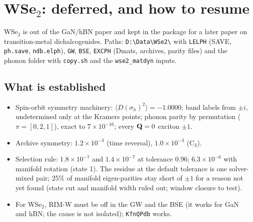 \section{WSe$_2$: deferred, and how to resume}
\label{sec:wse2}

WSe$_2$ is out of the GaN/hBN paper and kept in the package for a later paper
on transition-metal dichalcogenides. Paths: \texttt{D:\textbackslash Data\textbackslash WSe2\textbackslash}
with \texttt{LELPH} (SAVE, \texttt{ph.save}, \texttt{ndb.elph}), \texttt{GW},
\texttt{BSE}, \texttt{EXCPH} (Dmats, archives, parity files) and the phonon
folder with \texttt{copy.sh} and the \texttt{wse2\_matdyn} inputs.

\subsection{What is established}
\begin{itemize}[nosep,leftmargin=1.2em]
\item Spin-orbit symmetry machinery: $\langle D(\sigma_h)^2\rangle=-1.0000$; band
labels from $\pm i$, undetermined only at the Kramers points; phonon parity by
permutation ($\pi=[0,2,1]$), exact to $7\times10^{-16}$; every $\mathbf{Q}=0$ exciton
$\pm1$.
\item Archive symmetry: $1.2\times10^{-3}$ (time reversal), $1.0\times10^{-3}$
(C$_3$).
\item Selection rule: $1.8\times10^{-7}$ and $1.4\times10^{-7}$ at tolerance
0.96; $6.3\times10^{-6}$ with manifold rotation (state 1). The residue at the
default tolerance is one solver-mixed pair; 25\% of manifold eigen-parities stay
short of $\pm1$ for a reason not yet found (state cut and manifold width ruled
out; window closure to test).
\item For WSe$_2$, RIM-W must be off in the GW and the BSE (it works for GaN and
hBN; the cause is not isolated); \texttt{KfnQPdb} works.
\end{itemize}


